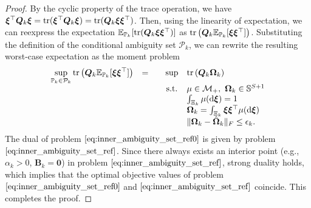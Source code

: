\documentclass{article}
\newcommand{\st}{\textnormal{s.t.}}
\newcommand{\PP}{\mathbb{P}}
\newcommand{\EE}{\mathbb{E}}
\newcommand{\tr}{\textup{tr}}
\begin{document}
\begin{proof}
By the cyclic property of the trace operation, we have $\bm\xi^\top \bm Q_k\bm\xi=\tr(\bm\xi^\top \bm Q_k\bm\xi)=\tr(\bm Q_k\bm\xi\bm\xi^\top )$. Then, using the linearity of expectation, we can reexpress the expectation $\EE_{\PP_k} [\tr(\bm Q_k\bm\xi\bm\xi^\top)]$ as $\tr\left( \bm Q_k \EE_{\PP_k} [\bm\xi \bm \xi^\top]\right)$. 
Substituting the definition of the conditional ambiguity set $\mathcal P_k$, we can rewrite the resulting worst-case expectation as the moment problem
\begin{equation}
\label{eq:inner_ambiguity_set_ref0}
\begin{array}{ccccl}
 \displaystyle\sup_{\PP_k \in \mathcal{P}_k} \tr\left( \bm Q_k \EE_{\PP_k} [\bm\xi \bm \xi^\top]\right) &= &  & \sup & \tr\left( \bm Q_k \bm \Omega_k \right)\\
& & & \st & \mu \in \mathcal{M}_+, \ \bm \Omega_k \in \mathbb{S}^{S+1}\\
& & & & \int_{\Xi_k} \mu (\mathrm{d} \bm \xi) = 1 \\
& & & & \bm \Omega_k = \int_{\Xi_k}\bm \xi \bm \xi^\top \mu(\mathrm{d} \bm \xi)\\
& & & & \| \bm \Omega_k - \hat{\bm \Omega}_k \|_F \leq \epsilon_k.
\end{array}
\end{equation}
The dual of problem $\eqref{eq:inner_ambiguity_set_ref0}$ is given by problem $\eqref{eq:inner_ambiguity_set_ref}$. Since there always exists an interior  point (e.g., $\alpha_k > 0$, $\bm B_k = \mathbf{0}$) in problem $\eqref{eq:inner_ambiguity_set_ref}$, strong duality holds, which implies that the optimal objective values of problem~$\eqref{eq:inner_ambiguity_set_ref0}$ and $\eqref{eq:inner_ambiguity_set_ref}$ coincide. This completes the proof.  
\end{proof}
\end{document}
